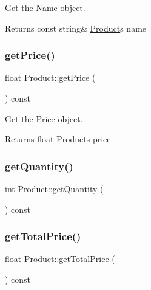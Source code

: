 Get the Name object. 

\begin{DoxyReturn}{Returns}
const string\& \hyperlink{classProduct}{Product}\textquotesingle{}s name 
\end{DoxyReturn}
\mbox{\label{classProduct_a0aaea95b8d3241b3758246254b8575e2}} 
\subsubsection{\texorpdfstring{get\+Price()}{getPrice()}}
{\footnotesize\ttfamily float Product\+::get\+Price (\begin{DoxyParamCaption}{ }\end{DoxyParamCaption}) const}



Get the Price object. 

\begin{DoxyReturn}{Returns}
float \hyperlink{classProduct}{Product}\textquotesingle{}s price 
\end{DoxyReturn}
\mbox{\label{classProduct_a6a449b90b669aa4380d229b44eca686f}} 
\subsubsection{\texorpdfstring{get\+Quantity()}{getQuantity()}}
{\footnotesize\ttfamily int Product\+::get\+Quantity (\begin{DoxyParamCaption}{ }\end{DoxyParamCaption}) const}

\mbox{\label{classProduct_a732aca2574f7a39e3a90837e0240e81f}} 
\subsubsection{\texorpdfstring{get\+Total\+Price()}{getTotalPrice()}}
{\footnotesize\ttfamily float Product\+::get\+Total\+Price (\begin{DoxyParamCaption}{ }\end{DoxyParamCaption}) const}



